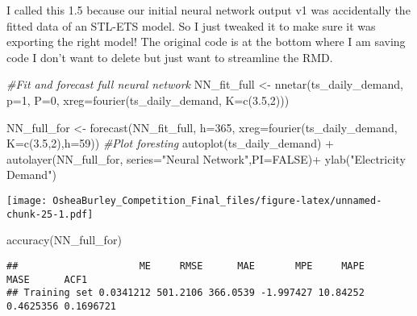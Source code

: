 \documentclass[
]{article}
\newenvironment{Shaded}{\begin{snugshade}}{\end{snugshade}}
\newcommand{\AttributeTok}[1]{\textcolor[rgb]{0.77,0.63,0.00}{#1}}
\newcommand{\CommentTok}[1]{\textcolor[rgb]{0.56,0.35,0.01}{\textit{#1}}}
\newcommand{\ConstantTok}[1]{\textcolor[rgb]{0.00,0.00,0.00}{#1}}
\newcommand{\DecValTok}[1]{\textcolor[rgb]{0.00,0.00,0.81}{#1}}
\newcommand{\FloatTok}[1]{\textcolor[rgb]{0.00,0.00,0.81}{#1}}
\newcommand{\FunctionTok}[1]{\textcolor[rgb]{0.00,0.00,0.00}{#1}}
\newcommand{\NormalTok}[1]{#1}
\newcommand{\OtherTok}[1]{\textcolor[rgb]{0.56,0.35,0.01}{#1}}
\newcommand{\SpecialCharTok}[1]{\textcolor[rgb]{0.00,0.00,0.00}{#1}}
\newcommand{\StringTok}[1]{\textcolor[rgb]{0.31,0.60,0.02}{#1}}
\begin{document}
I called this 1.5 because our initial neural network output v1 was
accidentally the fitted data of an STL-ETS model. So I just tweaked it
to make sure it was exporting the right model! The original code is at
the bottom where I am saving code I don't want to delete but just want
to streamline the RMD.

\begin{Shaded}
\begin{Highlighting}[]
\CommentTok{\#Fit and forecast full neural network}
\NormalTok{NN\_fit\_full }\OtherTok{\textless{}{-}}  \FunctionTok{nnetar}\NormalTok{(ts\_daily\_demand,}
                 \AttributeTok{p=}\DecValTok{1}\NormalTok{,}
                 \AttributeTok{P=}\DecValTok{0}\NormalTok{,}
                 \AttributeTok{xreg=}\FunctionTok{fourier}\NormalTok{(ts\_daily\_demand, }\AttributeTok{K=}\FunctionTok{c}\NormalTok{(}\FloatTok{3.5}\NormalTok{,}\DecValTok{2}\NormalTok{)))}

\NormalTok{NN\_full\_for }\OtherTok{\textless{}{-}} \FunctionTok{forecast}\NormalTok{(NN\_fit\_full, }
                   \AttributeTok{h=}\DecValTok{365}\NormalTok{,}
                   \AttributeTok{xreg=}\FunctionTok{fourier}\NormalTok{(ts\_daily\_demand, }
                                          \AttributeTok{K=}\FunctionTok{c}\NormalTok{(}\FloatTok{3.5}\NormalTok{,}\DecValTok{2}\NormalTok{),}\AttributeTok{h=}\DecValTok{59}\NormalTok{))}
\CommentTok{\#Plot foresting }
\FunctionTok{autoplot}\NormalTok{(ts\_daily\_demand) }\SpecialCharTok{+}
  \FunctionTok{autolayer}\NormalTok{(NN\_full\_for, }\AttributeTok{series=}\StringTok{"Neural Network"}\NormalTok{,}\AttributeTok{PI=}\ConstantTok{FALSE}\NormalTok{)}\SpecialCharTok{+}
  \FunctionTok{ylab}\NormalTok{(}\StringTok{"Electricity Demand"}\NormalTok{) }
\end{Highlighting}
\end{Shaded}

\texttt{[image: OsheaBurley\_Competition\_Final\_files/figure-latex/unnamed-chunk-25-1.pdf]}

\begin{Shaded}
\begin{Highlighting}[]
\FunctionTok{accuracy}\NormalTok{(NN\_full\_for)}
\end{Highlighting}
\end{Shaded}

\begin{verbatim}
##                     ME     RMSE      MAE       MPE     MAPE      MASE      ACF1
## Training set 0.0341212 501.2106 366.0539 -1.997427 10.84252 0.4625356 0.1696721
\end{verbatim}
\end{document}
